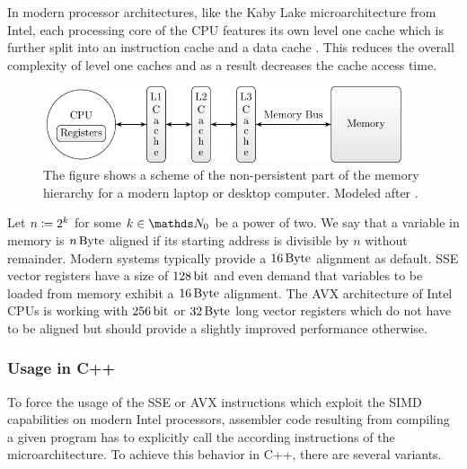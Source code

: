 \documentclass{stdlocal}
\begin{document}
    In modern processor architectures, like the Kaby Lake microarchitecture from Intel, each processing core of the CPU features its own level one cache which is further split into an instruction cache and a data cache \autocite{intel-kaby-lake}.
    This reduces the overall complexity of level one caches and as a result decreases the cache access time.
    \autocite[\ppno~78-83]{hennessy2019}
    \begin{figure}
      \center
      \includegraphics[width=0.95\textwidth]{figures/memory_hierarchy.pdf}
      \caption[Memory Hierarchy Scheme]{%
        The figure shows a scheme of the non-persistent part of the memory hierarchy for a modern laptop or desktop computer.
        Modeled after \textcite[\pno~79]{hennessy2019}.
      }
      \label{fig:memory-hierarchy}
    \end{figure}

    Let $n \coloneqq 2^k$ for some $k\in\setNatural_0$ be a power of two.
    We say that a variable in memory is $n\, \mathrm{Byte}$ aligned if its starting address is divisible by $n$ without remainder.
    Modern systems typically provide a $16\, \mathrm{Byte}$ alignment as default.
    SSE vector registers have a size of $128\, \mathrm{bit}$ and even demand that variables to be loaded from memory exhibit a $16\, \mathrm{Byte}$ alignment.
    The AVX architecture of Intel CPUs is working with $256\, \mathrm{bit}$ or $32\, \mathrm{Byte}$ long vector registers which do not have to be aligned but should provide a slightly improved performance otherwise.
    \autocite{fog2019a}

  \subsubsection*{Usage in C++} %
  \label{sub:usage_in_c_}
    To force the usage of the SSE or AVX instructions which exploit the SIMD capabilities on modern Intel processors, assembler code resulting from compiling a given program has to explicitly call the according instructions of the microarchitecture.
    To achieve this behavior in C++, there are several variants.
\end{document}
